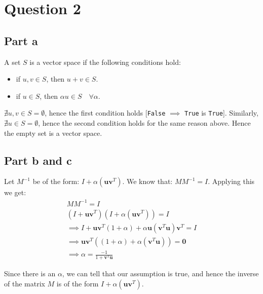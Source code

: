 \documentclass{article}
\begin{document}
\section*{Question 2}
\subsection*{Part a}
\begin{flushleft}
A set \(S\) is a vector space if the following conditions hold:
\begin{itemize}
\item if \(u, v \in S\), then \(u + v \in S\).
\item if \(u \in S\), then \(\alpha u \in S \quad \forall \alpha\).
\end{itemize}

\(\nexists u, v \in S = \emptyset\), hence the first condition holds [\texttt{False} \(\implies\) \texttt{True} is \texttt{True}]. Similarly, \(\nexists u \in S = \emptyset\), hence the second condition holds for the same reason above. Hence the empty set is a vector space.
\end{flushleft}

\subsection*{Part b and c}
\begin{flushleft}
Let \(M^{-1}\) be of the form: \(I + \alpha(\mathbf{u} \mathbf{v}^{T})\). We know that: \(M M^{-1} = I\). Applying this we get:
\begin{gather*}
M  M^{-1} = I \\
(I + \mathbf{u}\mathbf{v}^T) (I + \alpha(\mathbf{u}\mathbf{v}^{T})) = I \\
\implies I + \mathbf{u}\mathbf{v}^{T}(1 + \alpha) + \alpha\mathbf{u}(\mathbf{v}^{T} \mathbf{u})\mathbf{v}^{T} = I \\
\implies \mathbf{u}\mathbf{v}^{T}\left((1 + \alpha) + \alpha(\mathbf{v}^{T}\mathbf{u})\right) = \mathbf{0} \\
\implies \alpha = \displaystyle \frac{-1}{1 + \mathbf{v}^{T} \mathbf{u}} 
\end{gather*}

Since there is an \(\alpha\), we can tell that our assumption is true, and hence the inverse of the matrix \(M\) is of the form \(I + \alpha(\mathbf{u}\mathbf{v}^{T})\). 
\end{flushleft}
\end{document}
